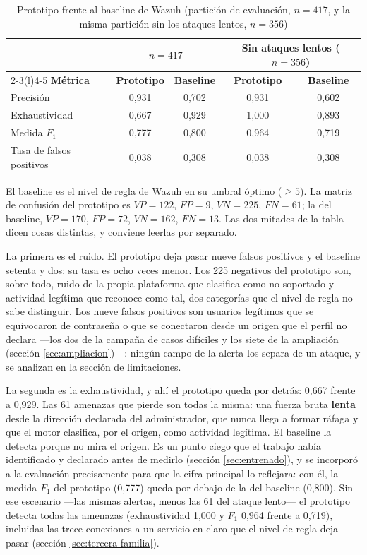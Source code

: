 \begin{table}[H]
  \centering
  \caption{Prototipo frente al baseline de Wazuh (partición de evaluación, $n=417$, y la misma
  partición sin los ataques lentos, $n=356$)}
  \label{tab:resultado-principal}
  \begin{tabular}{@{}lcccc@{}}
    \toprule
    & \multicolumn{2}{c}{\textbf{$n=417$}} & \multicolumn{2}{c}{\textbf{Sin ataques lentos ($n=356$)}} \\
    \cmidrule(lr){2-3}\cmidrule(l){4-5}
    \textbf{Métrica} & \textbf{Prototipo} & \textbf{Baseline} & \textbf{Prototipo} & \textbf{Baseline} \\
    \midrule
    Precisión & 0,931 & 0,702 & 0,931 & 0,602 \\
    Exhaustividad & 0,667 & 0,929 & 1,000 & 0,893 \\
    Medida $F_1$ & 0,777 & 0,800 & 0,964 & 0,719 \\
    Tasa de falsos positivos & 0,038 & 0,308 & 0,038 & 0,308 \\
    \bottomrule
  \end{tabular}
\end{table}

El baseline es el nivel de regla de Wazuh en su umbral óptimo ($\geq 5$). La matriz de confusión del
prototipo es $VP=122$, $FP=9$, $VN=225$, $FN=61$; la del baseline, $VP=170$, $FP=72$, $VN=162$,
$FN=13$. Las dos mitades de la tabla dicen cosas distintas, y conviene leerlas por separado.

La primera es el ruido. El prototipo deja pasar nueve falsos positivos y el baseline setenta y dos:
su tasa es ocho veces menor. Los 225 negativos del prototipo son, sobre todo, ruido de la propia
plataforma que clasifica como no soportado y actividad legítima que reconoce como tal, dos
categorías que el nivel de regla no sabe distinguir. Los nueve falsos positivos son usuarios
legítimos que se equivocaron de contraseña o que se conectaron desde un origen que el perfil no
declara ---los dos de la campaña de casos difíciles y los siete de la ampliación (sección
\ref{sec:ampliacion})---: ningún campo de la alerta los separa de un ataque, y se analizan en la
sección de limitaciones.

La segunda es la exhaustividad, y ahí el prototipo queda por detrás: 0,667 frente a 0,929. Las 61
amenazas que pierde son todas la misma: una fuerza bruta \textbf{lenta} desde la dirección
declarada del administrador, que nunca llega a formar ráfaga y que el motor clasifica, por el
origen, como actividad legítima. El baseline la detecta porque no mira el origen. Es un punto ciego
que el trabajo había identificado y declarado antes de medirlo (sección \ref{sec:entrenado}), y se
incorporó a la evaluación precisamente para que la cifra principal lo reflejara: con él, la medida
$F_1$ del prototipo (0,777) queda por debajo de la del baseline (0,800). Sin ese escenario ---las
mismas alertas, menos las 61 del ataque lento--- el prototipo detecta todas las amenazas
(exhaustividad 1,000 y $F_1$ 0,964 frente a 0,719), incluidas las trece conexiones a un servicio en
claro que el nivel de regla deja pasar (sección \ref{sec:tercera-familia}).

